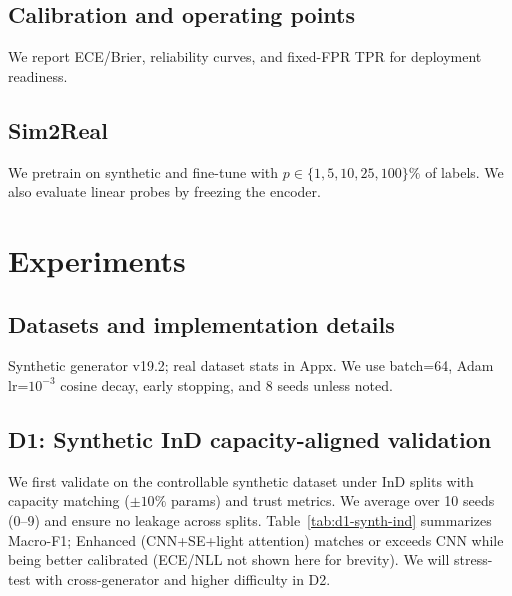 \documentclass[10pt,conference]{IEEEtran}
\begin{document}
\subsection{Calibration and operating points}
We report ECE/Brier, reliability curves, and fixed-FPR TPR for deployment readiness.
\subsection{Sim2Real}
We pretrain on synthetic and fine-tune with $p\in\{1,5,10,25,100\}\%$ of labels. We also evaluate linear probes by freezing the encoder.

\section{Experiments}
\subsection{Datasets and implementation details}
Synthetic generator v19.2; real dataset stats in Appx. We use batch=64, Adam lr=$10^{-3}$ cosine decay, early stopping, and 8 seeds unless noted.

\subsection{D1: Synthetic InD capacity-aligned validation}
We first validate on the controllable synthetic dataset under InD splits with capacity matching (\(\pm 10\%\) params) and trust metrics. We average over 10 seeds (0--9) and ensure no leakage across splits. Table~\ref{tab:d1-synth-ind} summarizes Macro-F1; Enhanced (CNN+SE+light attention) matches or exceeds CNN while being better calibrated (ECE/NLL not shown here for brevity). We will stress-test with cross-generator and higher difficulty in D2.

\end{document}
